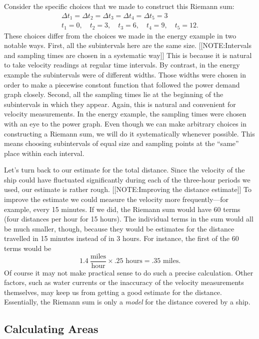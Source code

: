 Consider the specific choices that we made to construct this Riemann sum:
\begin{gather*}
\Delta t_1 = \Delta t_2 = \Delta t_3 = \Delta t_4 =
		\Delta t_5 = 3  \\[3pt]
t_1 = 0, \quad t_2 = 3, \quad t_3 = 6, \quad t_4 = 9,
		\quad t_5 = 12.
\end{gather*}
These choices differ from the choices we made in the energy example in
two notable ways.  First, all the subintervals here are the same size.
[[NOTE:Intervals and sampling times are chosen in  a systematic way]]
This is because it is natural to take velocity readings at regular
time intervals.  By contrast, in the energy example the subintervals
were of different widths.  Those widths were chosen in order to make a
piecewise constont function that followed the power demand graph
closely.  Second, all the sampling times lie at the beginning of the
subintervals in which they appear.  Again, this is natural and
convenient for velocity measurements.  In the energy example, the
sampling times were chosen with an eye to the power graph.  Even
though we can make arbitrary choices in constructing a Riemann sum, we
will do it systematically whenever possible.  This means choosing
subintervals of equal size and sampling points at the ``same'' place
within each interval.

Let's turn back to our estimate for the total distance.  Since the
velocity of the ship could have fluctuated significantly during each
of the three-hour periods we used, our estimate is rather rough.
[[NOTE:Improving the  distance estimate]] 
To improve the estimate we could measure the velocity more
frequently---for example, every 15 minutes.  If we did, the Riemann
sum would have 60 terms (four distances per hour for 15 hours).  The
individual terms in the sum would all be much smaller, though, because
they would be estimates for the distance travelled in 15 minutes
instead of in 3 hours.  For instance, the first of the 60 terms would
be
\[
1.4 \ \dfrac{\text{miles}}{\text{hour}} \times 
		.25 \text{ hours} = .35 \text{ miles}.
\]
Of course it may not make practical sense to do such a precise calculation.  Other factors, such as water currents or the inaccuracy of the velocity measurements themselves, may keep us from getting a good estimate for the distance.  Essentially, the Riemann sum is only a {\em model\/} for the distance covered by a ship. 


\subsection{Calculating Areas}
\label{subsec:calculating-areas}




